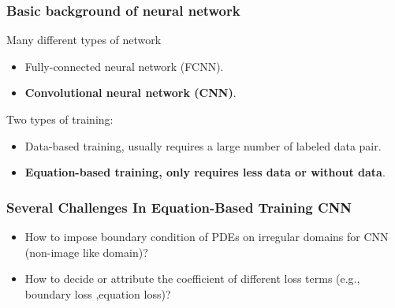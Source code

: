 \documentclass{beamer}
\begin{document}
\begin{frame}
\frametitle{Basic background of neural network}
Many different types of network
\begin{itemize}
\item Fully-connected neural network (FCNN).
\item \textbf{Convolutional neural network (CNN)}.
\end{itemize}
Two types of training:
\begin{itemize}
    \item Data-based training, usually requires a large number of labeled data pair.
    \item \textbf{Equation-based training, only requires less data or without data}.
\end{itemize}
\end{frame}

\begin{frame}
\frametitle{Several Challenges In Equation-Based Training CNN}
\begin{itemize}
\item How to impose boundary condition of PDEs  on irregular domains for CNN (non-image like domain)?   
\item How to decide or attribute the coefficient of different loss terms (e.g., boundary loss ,equation loss)?  
\end{itemize}
\end{frame}
\end{document}
